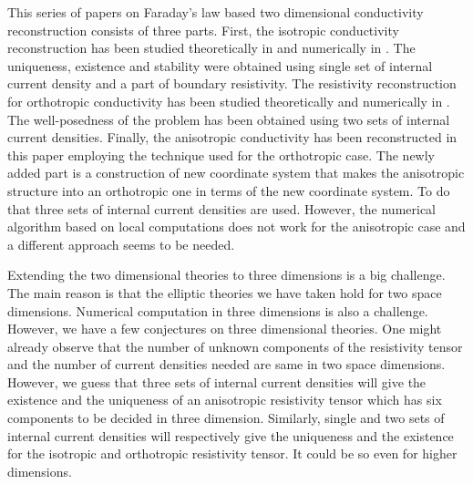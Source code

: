 \documentclass[11pt]{amsart}
\theoremstyle{plain}
\numberwithin{equation}{section}
\numberwithin{Thm}{section}
\begin{document}
This series of papers on Faraday's law based two dimensional conductivity reconstruction consists of three parts. First, the isotropic conductivity reconstruction has been studied theoretically in \cite{lee_well-posedness_2015} and numerically in \cite{lee_virtual_2014}. The uniqueness, existence and stability were obtained using single set of internal current density and a part of boundary resistivity. The resistivity reconstruction for orthotropic conductivity has been studied theoretically and numerically in \cite{lee_orthotropic_2015}. The well-posedness of the problem has been obtained using two sets of internal current densities. Finally, the anisotropic conductivity has been reconstructed in this paper employing the technique used for the orthotropic case. The newly added part is a construction of new coordinate system that makes the anisotropic structure into an orthotropic one in terms of the new coordinate system. To do that three sets of internal current densities are used. However, the numerical algorithm based on local computations does not work for the anisotropic case and a different approach seems to be needed.

Extending the two dimensional theories to three dimensions is a big challenge. The main reason is that the elliptic theories we have taken hold for two space dimensions. Numerical computation in three dimensions is also a challenge. However, we have a few conjectures on three dimensional theories. One might already observe that the number of unknown components of the resistivity tensor and the number of current densities needed are same in two space dimensions. However, we guess that three sets of internal current densities will give the existence and the uniqueness of an anisotropic resistivity tensor which has six components to be decided in three dimension. Similarly, single and two sets of internal current densities will respectively give the uniqueness and the existence for the isotropic and orthotropic resistivity tensor. It could be so even for higher dimensions.

\appendix
\end{document}
